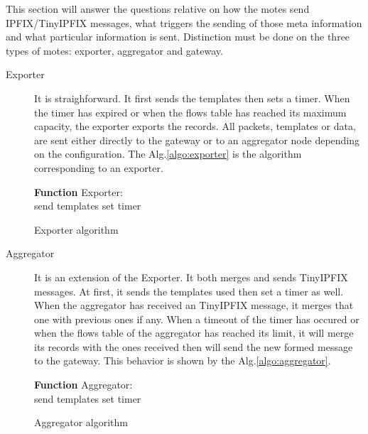 This section will answer the questions relative on how the motes send IPFIX/TinyIPFIX messages, what triggers the sending of those meta information and what particular information is sent. Distinction must be done on the three types of motes: exporter, aggregator and gateway.\\

\begin{description}
  \item[Exporter] It is straighforward. It first sends the templates then sets a timer. When the timer has expired or when the flows table has reached its maximum capacity, the exporter exports the records. All packets, templates or data, are sent either directly to the gateway or to an aggregator node depending on the configuration. The Alg.\ref{algo:exporter} is the algorithm corresponding to an exporter.

  \begin{algorithm}
    \textbf{Function} Exporter:\\
    send templates\;
    set timer\;
   \caption{Exporter algorithm}
   \label{algo:exporter}
  \end{algorithm}

  \item[Aggregator] It is an extension of the Exporter. It both merges and sends TinyIPFIX messages. At first, it sends the templates used then set a timer as well. When the aggregator has received an TinyIPFIX message, it merges that one with previous ones if any. When a timeout of the timer has occured or when the flows table of the aggregator has reached its limit, it will merge its records with the ones received then will send the new formed message to the gateway. This behavior is shown by the Alg.\ref{algo:aggregator}.

  \begin{algorithm}
    \textbf{Function} Aggregator:\\
    send templates\;
    set timer\;
   \caption{Aggregator algorithm}
   \label{algo:aggregator}
  \end{algorithm}


\end{description}
